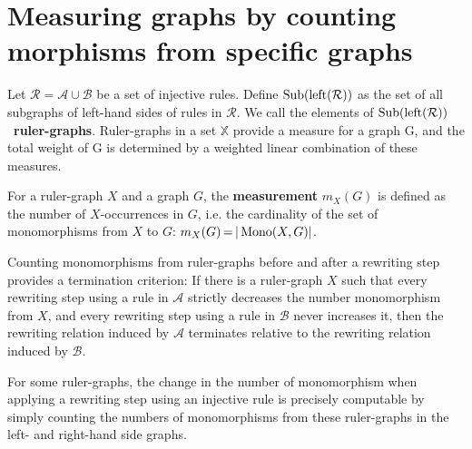 
\section{Measuring graphs by counting morphisms from specific graphs}
\label{subgraph_counting:sec:interpretation}
Let $\mathcal{R} \mathop{=} \mathcal{A} \mathop{\cup} \mathcal{B}$ be a set of injective rules.
Define $\operatorname{Sub}(\operatorname{left}(\mathcal{R}))$ as the set of all subgraphs of left-hand sides of rules in $\mathcal{R}$.
We call the elements of $\operatorname{Sub}(\operatorname{left}(\mathcal{R}))$~\textbf{ruler-graphs}. Ruler-graphs in a set $\mathbb{X}$ provide a measure for a graph
G, and the total weight of G is determined by a weighted linear
combination of these measures.

\begin{definition} 
    \label{subgraph_counting:def:measurement}
    For a ruler-graph \( X \) and a graph \( G \), the \textbf{measurement} \( m_X(G) \) is defined as the number of $X$-occurrences in $G$, i.e. the cardinality of the set of monomorphisms from $ X $ to $ G $:
    \(
        m_X(G) \mathop{=} |\operatorname{Mono}(X, G)|
    \).
\end{definition} 
Counting monomorphisms from ruler-graphs before and after a rewriting step provides a termination criterion: 
    If there is a ruler-graph $X$ such that every rewriting step using a rule in $\mathcal{A}$ strictly decreases the number monomorphism from $X$, and every rewriting step using a rule in $\mathcal{B}$ never increases it, then the rewriting relation induced by $\mathcal{A}$ terminates relative to the rewriting relation induced by $\mathcal{B}$.
 
For some ruler-graphs, the change in the number of monomorphism when applying a rewriting step using an injective rule is precisely computable by simply counting the numbers of monomorphisms from these ruler-graphs in the left- and right-hand side graphs. 

